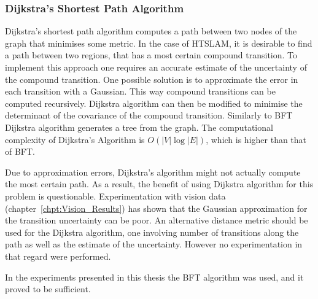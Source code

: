 \subsubsection{Dijkstra's Shortest Path Algorithm}


Dijkstra's shortest path algorithm computes a path between two nodes
of the graph that minimises some metric. In the case of HTSLAM, it is
desirable to find a path between two regions, that has a most certain
compound transition. To implement this approach one requires an
accurate estimate of the uncertainty of the compound transition.  One
possible solution is to approximate the error in each transition with
a Gaussian. This way compound transitions can be computed
recursively. Dijkstra algorithm can then be modified to minimise the
determinant of the covariance of the compound transition. Similarly to
BFT Dijkstra algorithm generates a tree from the graph. The
computational complexity of Dijkstra's Algorithm is $O(|V| \log |E|)$,
which is higher than that of BFT.

Due to approximation errors, Dijkstra's algorithm might not actually
compute the most certain path. As a result, the benefit of using
Dijkstra algorithm for this problem is questionable. Experimentation
with vision data (chapter~\ref{chpt:Vision_Results}) has shown that
the Gaussian approximation for the transition uncertainty can be poor.
An alternative distance metric should be used for the Dijkstra
algorithm, one involving number of transitions along the path as well
as the estimate of the uncertainty. However no experimentation in that
regard were performed.

In the experiments presented in this thesis the BFT algorithm was
used, and it proved to be sufficient.




